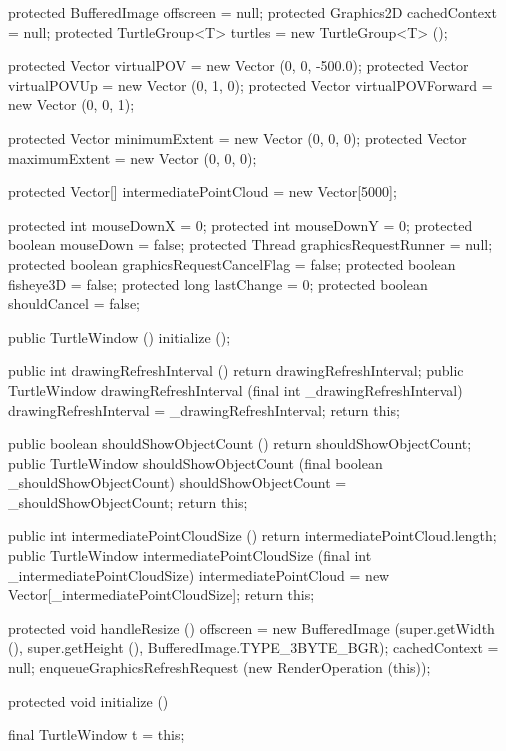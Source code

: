 \documentclass{report}
\begin{document}
\begin{javacode}
{  protected BufferedImage  offscreen                 = null;
  protected Graphics2D     cachedContext             = null;
  protected TurtleGroup<T> turtles                   = new TurtleGroup<T> ();

  protected Vector         virtualPOV                = new Vector (0, 0, -500.0);
  protected Vector         virtualPOVUp              = new Vector (0, 1, 0);
  protected Vector         virtualPOVForward         = new Vector (0, 0, 1);

  protected Vector         minimumExtent             = new Vector (0, 0, 0);
  protected Vector         maximumExtent             = new Vector (0, 0, 0);

  protected Vector[]       intermediatePointCloud    = new Vector[5000];

  protected int            mouseDownX                = 0;
  protected int            mouseDownY                = 0;
  protected boolean        mouseDown                 = false;
  protected Thread         graphicsRequestRunner     = null;
  protected boolean        graphicsRequestCancelFlag = false;
  protected boolean        fisheye3D                 = false;
  protected long           lastChange                = 0;
  protected boolean        shouldCancel              = false;
  
  public TurtleWindow () {initialize ();}

  public int          drawingRefreshInterval     () {return drawingRefreshInterval;}
  public TurtleWindow drawingRefreshInterval     (final int _drawingRefreshInterval) 
    {drawingRefreshInterval = _drawingRefreshInterval; return this;}

  public boolean      shouldShowObjectCount      () {return shouldShowObjectCount;}
  public TurtleWindow shouldShowObjectCount      (final boolean _shouldShowObjectCount)
    {shouldShowObjectCount = _shouldShowObjectCount; return this;}

  public int          intermediatePointCloudSize () {return intermediatePointCloud.length;}
  public TurtleWindow intermediatePointCloudSize (final int _intermediatePointCloudSize)
    {intermediatePointCloud = new Vector[_intermediatePointCloudSize]; return this;}

  protected void handleResize () {
    offscreen     = new BufferedImage (super.getWidth (), super.getHeight (), BufferedImage.TYPE_3BYTE_BGR);
    cachedContext = null;
    enqueueGraphicsRefreshRequest (new RenderOperation (this));
  }

  protected void initialize () {
    final TurtleWindow t = this;

}}
\end{javacode}
\end{document}
